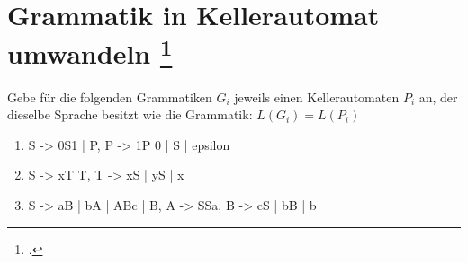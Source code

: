 \documentclass{lehramt-informatik-aufgabe}
\begin{document}
\section{Grammatik in Kellerautomat umwandeln
\footcite{theo:ab:2}}

Gebe für die folgenden Grammatiken $G_i$ jeweils einen Kellerautomaten $P_i$
an, der dieselbe Sprache besitzt wie die Grammatik: $L(G_i) = L(P_i)$

\begin{enumerate}


\item

\begin{liProduktionsRegeln}
S -> 0S1 | P,
P -> 1P 0 | S | epsilon
\end{liProduktionsRegeln}


\item

\begin{liProduktionsRegeln}
S -> xT T,
T -> xS | yS | x
\end{liProduktionsRegeln}


\item

\begin{liProduktionsRegeln}
S -> aB | bA | ABc | B,
A -> SSa,
B -> cS | bB | b
\end{liProduktionsRegeln}
\end{enumerate}
\end{document}
